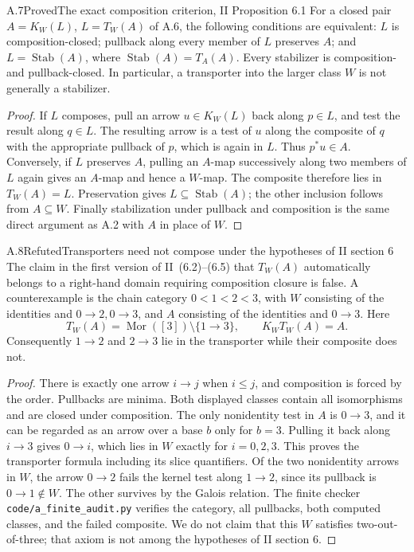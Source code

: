 \begin{claim}{A.7}{Proved}{The exact composition criterion, II Proposition 6.1}
For a closed pair $A=K_W(L)$, $L=T_W(A)$ of A.6, the following conditions are equivalent: $L$ is composition-closed; pullback along every member of $L$ preserves $A$; and $L=\operatorname{Stab}(A)$, where $\operatorname{Stab}(A)=T_A(A)$. Every stabilizer is composition- and pullback-closed. In particular, a transporter into the larger class $W$ is not generally a stabilizer.
\end{claim}
\begin{proof}
If $L$ composes, pull an arrow $u\in K_W(L)$ back along $p\in L$, and test the result along $q\in L$. The resulting arrow is a test of $u$ along the composite of $q$ with the appropriate pullback of $p$, which is again in $L$. Thus $p^*u\in A$. Conversely, if $L$ preserves $A$, pulling an $A$-map successively along two members of $L$ again gives an $A$-map and hence a $W$-map. The composite therefore lies in $T_W(A)=L$. Preservation gives $L\subseteq\operatorname{Stab}(A)$; the other inclusion follows from $A\subseteq W$. Finally stabilization under pullback and composition is the same direct argument as A.2 with $A$ in place of $W$.
\end{proof}

\begin{claim}{A.8}{Refuted}{Transporters need not compose under the hypotheses of II section 6}
The claim in the first version of II~(6.2)--(6.5) that $T_W(A)$ automatically belongs to a right-hand domain requiring composition closure is false. A counterexample is the chain category $0<1<2<3$, with $W$ consisting of the identities and $0\to2,0\to3$, and $A$ consisting of the identities and $0\to3$. Here
\[
T_W(A)=\operatorname{Mor}([3])\setminus\{1\to3\},\qquad
K_WT_W(A)=A.
\]
Consequently $1\to2$ and $2\to3$ lie in the transporter while their composite does not.
\end{claim}
\begin{proof}
There is exactly one arrow $i\to j$ when $i\leq j$, and composition is forced by the order. Pullbacks are minima. Both displayed classes contain all isomorphisms and are closed under composition. The only nonidentity test in $A$ is $0\to3$, and it can be regarded as an arrow over a base $b$ only for $b=3$. Pulling it back along $i\to3$ gives $0\to i$, which lies in $W$ exactly for $i=0,2,3$. This proves the transporter formula including its slice quantifiers. Of the two nonidentity arrows in $W$, the arrow $0\to2$ fails the kernel test along $1\to2$, since its pullback is $0\to1\notin W$. The other survives by the Galois relation. The finite checker \texttt{code/a\_finite\_audit.py} verifies the category, all pullbacks, both computed classes, and the failed composite. We do not claim that this $W$ satisfies two-out-of-three; that axiom is not among the hypotheses of II section 6.
\end{proof}

